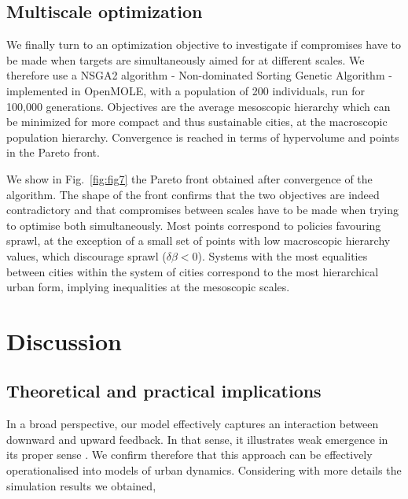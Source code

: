 \documentclass[referee,lineno,pdflatex,sn-apa]{sn-jnl}
\begin{document}
\subsection{Multiscale optimization}



We finally turn to an optimization objective to investigate if compromises have to be made when targets are simultaneously aimed for at different scales. We therefore use a NSGA2 algorithm - Non-dominated Sorting Genetic Algorithm - implemented in OpenMOLE, with a population of 200 individuals, run for 100,000 generations. Objectives are the average mesoscopic hierarchy which can be minimized for more compact and thus sustainable cities, at the macroscopic population hierarchy. Convergence is reached in terms of hypervolume and points in the Pareto front.

We show in Fig.~\ref{fig:fig7} the Pareto front obtained after convergence of the algorithm. The shape of the front confirms that the two objectives are indeed contradictory and that compromises between scales have to be made when trying to optimise both simultaneously. Most points correspond to policies favouring sprawl, at the exception of a small set of points with low macroscopic hierarchy values, which discourage sprawl ($\delta \beta < 0$). Systems with the most equalities between cities within the system of cities correspond to the most hierarchical urban form, implying inequalities at the mesoscopic scales.



\section{Discussion}



\subsection{Theoretical and practical implications}

In a broad perspective, our model effectively captures an interaction between downward and upward feedback. In that sense, it illustrates weak emergence in its proper sense \citep{bedau2002downward}. We confirm therefore that this approach can be effectively operationalised into models of urban dynamics. 
Considering with more details the simulation results we obtained, %
\end{document}
